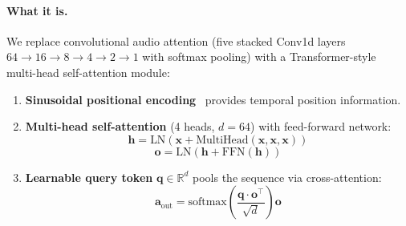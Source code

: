\documentclass[10pt,twocolumn,letterpaper]{article}
\begin{document}
\paragraph{What it is.}
We replace convolutional audio attention (five stacked Conv1d layers $64 {\to} 16 {\to} 8 {\to} 4 {\to} 2 {\to} 1$ with softmax pooling) with a Transformer-style~\cite{vaswani2017attention} multi-head self-attention module:

\begin{enumerate}[nosep,leftmargin=*]
    \item \textbf{Sinusoidal positional encoding}~\cite{vaswani2017attention} provides temporal position information.
    \item \textbf{Multi-head self-attention} (4 heads, $d{=}64$) with feed-forward network:
    \begin{equation}
        \mathbf{h} = \text{LN}(\mathbf{x} + \text{MultiHead}(\mathbf{x}, \mathbf{x}, \mathbf{x}))
    \end{equation}
    \begin{equation}
        \mathbf{o} = \text{LN}(\mathbf{h} + \text{FFN}(\mathbf{h}))
    \end{equation}
    \item \textbf{Learnable query token} $\mathbf{q} \in \mathbb{R}^d$ pools the sequence via cross-attention:
    \begin{equation}
        \mathbf{a}_{\text{out}} = \text{softmax}\!\left(\frac{\mathbf{q} \cdot \mathbf{o}^\top}{\sqrt{d}}\right) \mathbf{o}
    \end{equation}
\end{enumerate}
\end{document}
